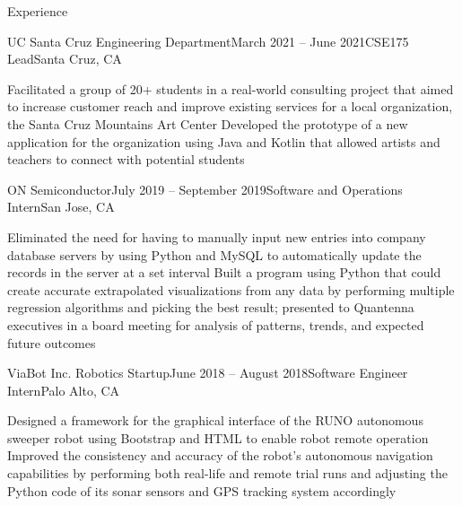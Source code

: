 \documentclass[fontsize=11pt,fontface=cormorantgaramond,fitpage]{cvtemplate}
\begin{document}
\begin{cvtext}
\begin{cvsection}{Experience}
  \begin{cvsubsection}
    {UC Santa Cruz Engineering Department}{March 2021 -- June 2021}{CSE175 Lead}{Santa Cruz, CA}

    \listitem Facilitated a group of 20+ students in a real-world consulting project that aimed to increase customer reach and improve existing services for a local organization, the Santa Cruz Mountains Art Center
    \listitem Developed the prototype of a new application for the organization using Java and Kotlin that allowed artists and teachers to connect with potential students

  \end{cvsubsection}


  \begin{cvsubsection}
    {ON Semiconductor}{July 2019 -- September 2019}{Software and Operations Intern}{San Jose, CA}

    \listitem Eliminated the need for having to manually input new entries into company database servers by using Python and MySQL to automatically update the records in the server at a set interval
    \listitem Built a program using Python that could create accurate extrapolated visualizations from any data by performing multiple regression algorithms and picking the best result; presented to Quantenna executives in a board meeting for analysis of patterns, trends, and expected future outcomes

  \end{cvsubsection}


  \begin{cvsubsection}
    {ViaBot Inc. Robotics Startup}{June 2018 -- August 2018}{Software Engineer Intern}{Palo Alto, CA}

    \listitem Designed a framework for the graphical interface of the RUNO autonomous sweeper robot using Bootstrap and HTML to enable robot remote operation
    \listitem Improved the consistency and accuracy of the robot's autonomous navigation capabilities by performing both real-life and remote trial runs and adjusting the Python code of its sonar sensors and GPS tracking system accordingly

  \end{cvsubsection}


\end{cvsection}


\end{cvtext}
\end{document}
